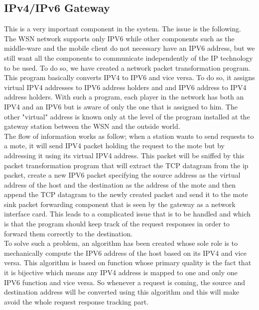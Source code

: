 \documentclass[conference]{IEEEtran}
\begin{document}
\subsection{IPv4/IPv6 Gateway}
This is a very important component in the system. The issue is the following. The WSN network supports only IPV6 while other components such as the middle-ware and the mobile client do not necessary have an IPV6 address, but we still want all the components to communicate independently of the IP technology to be used. To do so, we have created a network packet transformation program. This program basically converts IPV4 to IPV6 and vice versa. To do so, it assigns virtual IPV4 addresses to IPV6 address holders and and IPV6 address to IPV4 address holders. With such a program, each player in the network has both an IPV4 and an IPV6 but is aware of only the one that is assigned to him. The other "virtual" address is known only at the level of the program installed at the gateway station between the WSN and the outside world. 
\\
 The flow of information works as follow; when a station wants to send requests to a mote, it will send IPV4 packet holding the request to the mote but by addressing it using its virtual IPV4 address. This packet will be sniffed by this packet transformation program that will extract the TCP datagram from the ip packet, create a new IPV6 packet specifying the source address as the virtual address of the host and the destination as the address of the mote and then append the TCP datagram to the newly created packet and send it to the mote sink packet forwarding component that is seen by the gateway as a network interface card. This leads to a complicated issue that is to be handled and which is that the program should keep track of the request responses in order to forward them correctly to the destination. 
\\
To solve such a problem, an algorithm has been created whose sole role is to mechanically compute the IPV6 address of the host based on its IPV4 and vice versa. This algorithm is based on function whose primary quality is the fact that it is bijective which means any IPV4 address is mapped to one and only one IPV6 function and vice versa. So whenever a request is coming, the source and destination address will be converted using this algorithm and this will make avoid the whole request response tracking part.
\end{document}
